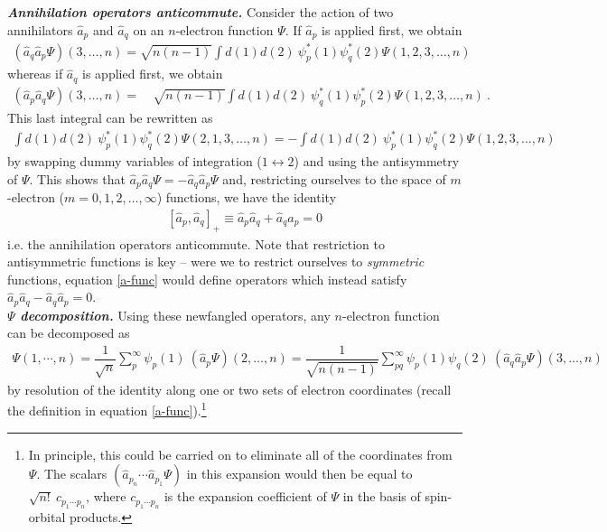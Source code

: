 \documentclass[11pt,fleqn]{article}
\newcommand{\y}{\psi}        %
\newcommand{\Y}{\Psi}        %
\newcommand{\op}[1]{\ensuremath{\hat{#1}}}
\newcommand{\ld}{\ensuremath{\ldots}}
\newcommand{\cd}{\ensuremath{\cdots}}
\newcommand{\bmit}[1]{{\bfseries\itshape\mathversion{bold}#1}}
\newcommand{\fr}[2]{\ensuremath{\dfrac{#1}{#2}}}
\theoremstyle{mystyle}
\begin{document}
\noindent
\bmit{Annihilation operators anticommute.}
Consider the action of two annihilators $\op{a}_p$ and $\op{a}_q$ on an $n$-electron function $\Y$.
If $\op{a}_p$ is applied first, we obtain
\begin{align*}
  (\op{a}_q\op{a}_p\Y)(3,\ld,n)
=
  \sqrt{n(n-1)}
  \int d(1)d(2)\
  \y_p^*(1)\y_q^*(2)\Y(1,2,3,\ld,n)
\end{align*}
whereas if $\op{a}_q$ is applied first, we obtain
\begin{align*}
  (\op{a}_p\op{a}_q\Y)(3,\ld,n)
=&\
  \sqrt{n(n-1)}
  \int d(1)d(2)\
  \y_q^*(1)\y_p^*(2)\Y(1,2,3,\ld,n)\ .
\end{align*}
This last integral can be rewritten as
\begin{align*}
  \int d(1)d(2)\
  \y_p^*(1)\y_q^*(2)\Y(2,1,3,\ld,n)
=
-
  \int d(1)d(2)\
  \y_p^*(1)\y_q^*(2)\Y(1,2,3,\ld,n)
\end{align*}
by swapping dummy variables of integration ($1\leftrightarrow2$) and using the antisymmetry of $\Y$.
This shows that $\op{a}_p\op{a}_q\Y=-\op{a}_q\op{a}_p\Y$ and, restricting ourselves to the space of $m$-electron ($m=0,1,2,\ld,\infty$) functions, we have the identity
\begin{align}
&&
  [\op{a}_p,\op{a}_q]_+
\equiv
  \op{a}_p\op{a}_q + \op{a}_q\op{a}_p
=
  0
\end{align}
i.e. the annihilation operators anticommute.
Note that restriction to antisymmetric functions is key -- were we to restrict ourselves to \textit{symmetric} functions, equation \ref{a-func} would define operators which instead satisfy $\op{a}_p\op{a}_q-\op{a}_q\op{a}_p=0$.\\


\noindent
\bmit{$\Y$ decomposition.}
Using these newfangled operators, any $n$-electron function can be decomposed as
\begin{align}
\label{decomp}
  \Y(1,\cd,n)
=
  \fr{1}{\sqrt{n}}
  \sum_p^\infty
  \y_p(1)\ (\op{a}_p\Y)(2,\ld,n)
=
  \fr{1}{\sqrt{n(n-1)}}
  \sum_{pq}^\infty
  \y_p(1)\y_q(2)\ (\op{a}_q\op{a}_p\Y)(3,\ld,n)
\end{align}
by resolution of the identity along one or two sets of electron coordinates  (recall the definition in equation \ref{a-func}).\footnote{
In principle, this could be carried on to eliminate all of the coordinates from $\Y$.
The scalars $(\op{a}_{p_n}\cd\op{a}_{p_1}\Y)$ in this expansion would then be equal to $\sqrt{n!}\ c_{p_1\cd p_n}$, where $c_{p_1\cd p_n}$ is the expansion coefficient of $\Y$ in the basis of spin-orbital products.}
\end{document}
